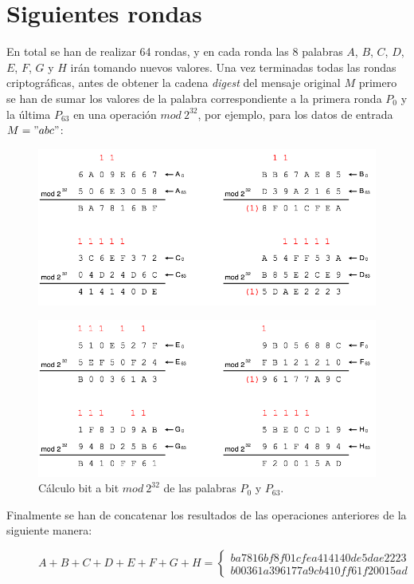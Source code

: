 \documentclass{article}
\begin{document}
\section{Siguientes rondas}
    En total se han de realizar 64 rondas, y en cada ronda las 8 palabras $A$, $B$, $C$, $D$, $E$, $F$, $G$ y $H$ irán tomando nuevos valores. Una vez terminadas todas las rondas criptográficas, antes de obtener la cadena \textit{digest} del mensaje original $M$ primero se han de sumar los valores de la palabra correspondiente a la primera ronda $P_{0}$ y la última $P_{63}$ en una operación $mod \ 2^{32}$, por ejemplo, para los datos de entrada $M = "abc"$:
        \begin{figure}[H]
        \centering
            \includegraphics[scale=0.41]{img/SHA-256-last_calculation_0.png}
        \end{figure}
        \begin{figure}[H]
        \centering
            \includegraphics[scale=0.41]{img/SHA-256-last_calculation_1.png}
            \caption{Cálculo bit a bit $mod \ 2^{32}$ de las palabras $P_{0}$ y $P_{63}$.}
        \end{figure}
    Finalmente se han de concatenar los resultados de las operaciones anteriores de la siguiente manera:
        \begin{figure}[H]
        \centering
            $A+B+C+D+E+F+G+H = \left \{
                \begin{array}{c}
                    ba7816bf8f01cfea414140de5dae2223 \\
                    b00361a396177a9cb410ff61f20015ad
                \end{array}
                \right .$
        \end{figure}
\end{document}
